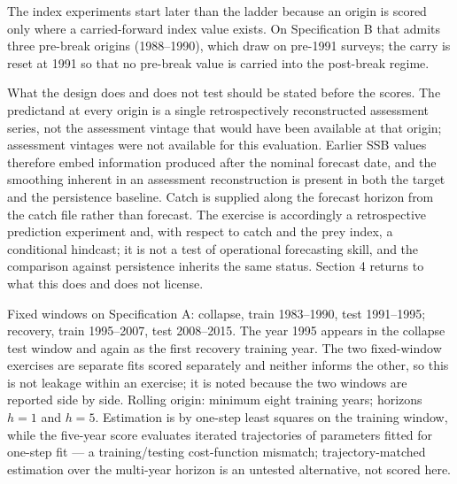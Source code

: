 \documentclass[11pt]{article}
\begin{document}
The index experiments start later than the ladder because an origin is
scored only where a carried-forward index value exists. On Specification
B that admits three pre-break origins (1988--1990), which draw on
pre-1991 surveys; the carry is reset at 1991 so that no pre-break value
is carried into the post-break regime.


What the design does and does not test should be stated before the
scores. The predictand at every origin is a single retrospectively
reconstructed assessment series, not the assessment vintage that would
have been available at that origin; assessment vintages were not available for this
evaluation. Earlier SSB values therefore embed information produced
after the nominal forecast date, and the smoothing inherent in an
assessment reconstruction is present in both the target and the
persistence baseline. Catch is supplied along the forecast horizon from
the catch file rather than forecast. The exercise is accordingly
a retrospective prediction experiment and, with respect to catch and the
prey index, a conditional hindcast; it is not a test of operational
forecasting skill, and the comparison against persistence inherits the
same status. Section 4 returns to what this does and does not license.

Fixed windows on Specification A: collapse, train 1983--1990, test
1991--1995; recovery, train 1995--2007, test 2008--2015. The year 1995
appears in the collapse test window and again as the first recovery
training year. The two fixed-window exercises are separate fits scored
separately and neither informs the other, so this is not leakage within
an exercise; it is noted because the two windows are reported side by
side. Rolling origin:
minimum eight training years; horizons \(h=1\) and \(h=5\). Estimation
is by one-step least squares on the training window, while the five-year
score evaluates iterated trajectories of parameters fitted for one-step
fit --- a training/testing cost-function mismatch;
trajectory-matched estimation over the multi-year horizon is an
untested alternative, not scored here.
\end{document}
